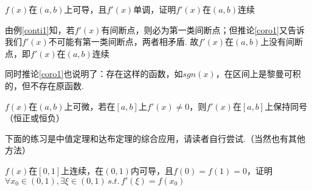 \begin{theorem}
\label{mono_and_conti}
$f(x)$在$(a,b)$上可导，且$f'(x)$单调，证明$f'(x)$在$(a,b)$连续
\end{theorem}
\begin{analysis}
由例\ref{conti1}知，若$f'(x)$有间断点，则必为第一类间断点；但推论\ref{coro1}又告诉我们$f'(x)$不可能有第一类间断点，两者相矛盾. 故$f'(x)$在$(a,b)$上没有间断点，即$f'(x)$在$(a,b)$连续
\end{analysis}
同时推论\ref{coro1}也说明了：存在这样的函数，如$sgn(x)$，在区间上是黎曼可积的，但不存在原函数.
\begin{corollary}
$f(x)$在$(a,b)$上可微，若在$[a,b]$上$f'(x)\ne 0$，则$f'(x)$在$[a,b]$上保持同号（恒正或恒负）
\end{corollary}
下面的练习是中值定理和达布定理的综合应用，请读者自行尝试.（当然也有其他方法）
\begin{exercise}
$f(x)$在$[0,1]$上连续，在$(0,1)$内可导，且$f(0)=f(1)=0$，证明$\forall x_0\in(0,1),\exists\xi\in(0,1)\,s.t.\,f'(\xi)=f(x_0)$
\end{exercise}

